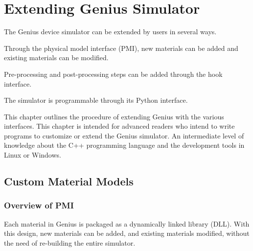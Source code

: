 \documentclass[oneside,12pt]{cgd_book}
\begin{document}
\chapter{Extending Genius Simulator}
The Genius device simulator can be extended by users in several ways.
\par
\begin{compactitem}
\item Through the physical model interface (PMI), new materials can be added and existing materials can be
        modified.
\par
\item Pre-processing and post-processing steps can be added through the hook interface.
\par
\item The simulator is programmable through its Python interface.
\par
\end{compactitem}
This chapter outlines the procedure of extending Genius with the various interfaces. This chapter is intended
    for advanced readers who intend to write programs to customize or extend the Genius simulator. An intermediate level
    of knowledge about the C++ programming language and the development tools in Linux or Windows.
\par
\section{Custom Material Models}
\par
\subsection{Overview of PMI}
Each material in Genius is packaged as a dynamically linked library (DLL). With this design, new materials
        can be added, and existing materials modified, without the need of re-building the entire simulator.
\par
\end{document}
